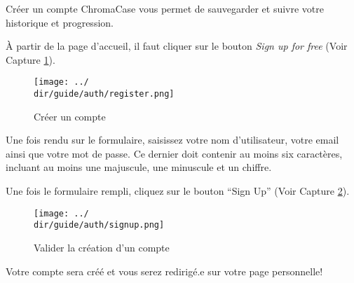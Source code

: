 Créer un compte ChromaCase vous permet de sauvegarder et suivre votre historique et progression.

À partir de la page d’accueil, il faut cliquer sur le bouton \textit{Sign up for free} (Voir Capture \ref{fig:signup}).

\begin{figure}[H]
	\texttt{[image: ../\\dir/guide/auth/register.png]}
	\caption{Créer un compte}
	\label{fig:signup}
\end{figure}

Une fois rendu sur le formulaire, saisissez votre nom d’utilisateur, votre email ainsi que votre mot de passe.
Ce dernier doit contenir au moins six caractères, incluant au moins une majuscule, une minuscule et un chiffre.

Une fois le formulaire rempli, cliquez sur le bouton “Sign Up” (Voir Capture \ref{fig:signup-form}).

\begin{figure}[H]
	\begin{center}
		\texttt{[image: ../\\dir/guide/auth/signup.png]}
		\caption{Valider la création d'un compte}
		\label{fig:signup-form}
	\end{center}
\end{figure}

Votre compte sera créé et vous serez redirigé.e sur votre page personnelle!
